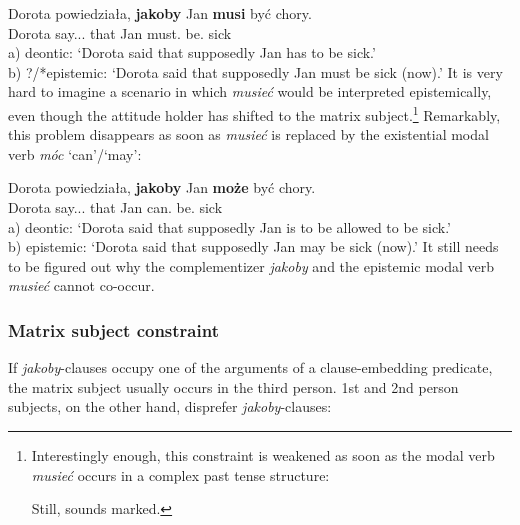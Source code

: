 \documentclass[output=paper]{langsci/langscibook}
\begin{document}
\ea \gll Dorota powiedziała, \textbf{jakoby} Jan \textbf{musi} być chory. \\
		Dorota say.{\lptcp}.{\sg}.{\fem} that Jan must.{\thirdperson}{\sg} be.{\infv} sick \\
\glt	a) deontic: `Dorota said that supposedly Jan has to be sick.'\\
	b) ?/*epistemic: `Dorota said that supposedly Jan must be sick (now).'
\z
It is very hard to imagine a scenario in which \emph{musieć} would be interpreted epistemically, even though the attitude holder has shifted to the matrix subject.{\footnote{Interestingly enough, this constraint is weakened as soon as the modal verb \emph{musieć} occurs in a complex past tense structure:

\z
Still,  sounds marked.}}
 Remarkably, this problem disappears as soon as \emph{musieć} is replaced by the existential modal verb \emph{móc} `can'\slash `may':

\ea \gll Dorota powiedziała, \textbf{jakoby} Jan \textbf{może} być chory. \\
		Dorota say.{\lptcp}.{\sg}.{\fem} that Jan can.{\thirdperson}{\sg} be.{\infv} sick \\
\glt	a) deontic: `Dorota said that supposedly Jan is to be allowed to be sick.'\\
 	b) epistemic: `Dorota said that supposedly Jan may be sick (now).'
\z
It still needs to be figured out why the complementizer \emph{jakoby} and the epistemic modal verb \emph{musieć} cannot co-occur.

\subsubsection{Matrix subject constraint}
If \emph{jakoby}-clauses occupy one of the arguments of a clause-embedding predicate, the matrix subject usually occurs in the third person. 1st and 2nd person subjects, on the other hand, disprefer \emph{jakoby}-clauses:
\end{document}
